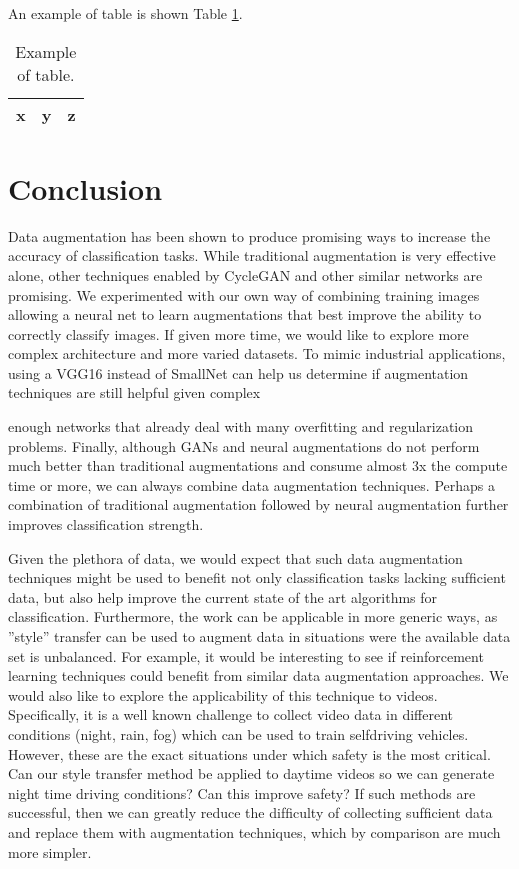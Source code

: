 \documentclass[a4paper,11pt]{article}
\begin{document}
An example of table is shown Table \ref{tab:mytab}.
\begin{table}[!ht]
\begin{center}
\begin{tabular}{|c|c|c|}
\hline
x & y & z\\
\hline
\end{tabular}
\end{center}
\vspace{-20pt}
\caption{Example of table.} \label{tab:mytab}
  \vspace{-10pt}
\end{table}

\section{Conclusion}
Data augmentation has been shown to produce promising ways to increase the accuracy of classiﬁcation tasks. While traditional augmentation is very effective alone, other techniques enabled by CycleGAN and other similar networks are promising. We experimented with our own way of combining training images allowing a neural net to learn augmentations that best improve the ability to correctly classify images. If given more time, we would like to explore more complex architecture and more varied datasets. To mimic industrial applications, using a VGG16 instead of SmallNet can help us determine if augmentation techniques are still helpful given complex

enough networks that already deal with many overﬁtting and regularization problems. Finally, although GANs and neural augmentations do not perform much better than traditional augmentations and consume almost 3x the compute time or more, we can always combine data augmentation techniques. Perhaps a combination of traditional augmentation followed by neural augmentation further improves classiﬁcation strength.

Given the plethora of data, we would expect that such data augmentation techniques might be used to beneﬁt not only classiﬁcation tasks lacking sufﬁcient data, but also help improve the current state of the art algorithms for classiﬁcation. Furthermore, the work can be applicable in more generic ways, as ”style” transfer can be used to augment data in situations were the available data set is unbalanced. For example, it would be interesting to see if reinforcement learning techniques could beneﬁt from similar data augmentation approaches. We would also like to explore the applicability of this technique to videos. Speciﬁcally, it is a well known challenge to collect video data in different conditions (night, rain, fog) which can be used to train selfdriving vehicles. However, these are the exact situations under which safety is the most critical. Can our style transfer method be applied to daytime videos so we can generate night time driving conditions? Can this improve safety? If such methods are successful, then we can greatly reduce the difﬁculty of collecting sufﬁcient data and replace them with augmentation techniques, which by comparison are much more simpler.




\end{document}
